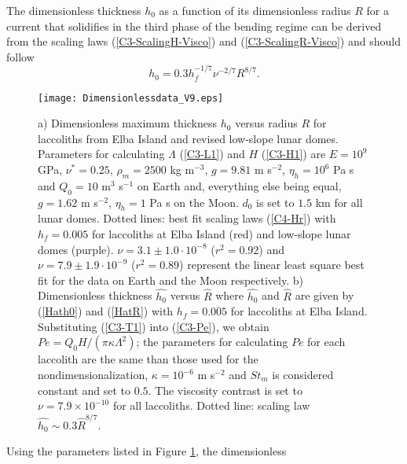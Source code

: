 The dimensionless thickness  $h_0$ as a function  of its dimensionless
radius $R$  for a current  that solidifies in  the third phase  of the
bending   regime    can   be    derived   from   the    scaling   laws
(\ref{C3-ScalingH-Visco})  and  (\ref{C3-ScalingR-Visco})  and  should
follow
\begin{equation}
  h_0 = 0.3 h_f^{-1/7}\nu^{-2/7}R^{8/7}\label{C4-Hr}.
\end{equation}
\begin{figure}[h!]
  \begin{center}
    \graphicspath{ {/Users/thorey/Documents/These/Projet/Refroidissement/Skin_Model/Figure/Figure_Heating/} }
    \texttt{[image: Dimensionlessdata\_V9.eps]}
    \caption{a)  Dimensionless maximum  thickness $h_0$  versus radius
      $R$ for laccoliths from Elba  Island and revised low-slope lunar
      domes.  Parameters  for calculating $\Lambda$  (\ref{C3-L1}) and
      $H$    (\ref{C3-H1})    are    $E=10^9$    GPa,    $\nu^*=0.25$,
      $\rho_m = 2500$ kg m$^{-3}$, $g=9.81$ m s$^{-2}$, $\eta_h =10^6$
      Pa s and $Q_0 = 10$ m$^3$ s$^{-1}$ on Earth and, everything else
      being  equal, $g=1.62$  m  s$^{-2}$,  $\eta_h =1$  Pa  s on  the
      Moon. $d_0$  is set  to $1.5$  km for  all lunar  domes.  Dotted
      lines: best  fit scaling laws  (\ref{C4-Hr}) with $h_f  = 0.005$
      for laccoliths  at Elba Island  (red) and low-slope  lunar domes
      (purple).   $\nu =  3.1\pm 1.0  \cdot 10^{-8}$  ($r^2=0.92$) and
      $\nu  = 7.9\pm  1.9  \cdot 10^{-9}$  ($r^2=0.89$) represent  the
      linear least square best fit for  the data on Earth and the Moon
      respectively.   b)  Dimensionless thickness  $\hat{h_0}$  versus
      $\hat{R}$  where   $\hat{h_0}$  and   $\hat{R}$  are   given  by
      (\ref{Hath0}) and  (\ref{HatR}) with $h_f=0.005$  for laccoliths
      at Elba Island.   Substituting (\ref{C3-T1}) into (\ref{C3-Pe}),
      we obtain $Pe  = Q_0 H /(\pi \kappa  \Lambda^2)$; the parameters
      for calculating $Pe$ for each  laccolith are the same than those
      used for the  nondimensionalization, $\kappa=10^{-6}$ m s$^{-2}$
      and  $St_m$  is  considered  constant and  set  to  $0.5$.   The
      viscosity contrast is  set to $\nu =7.9\times  10^{-10}$ for all
      laccoliths.         Dotted        line:       scaling        law
      $ \hat{h_0} \sim 0.3\hat{R}^{8/7}$.}
    \label{C4-Data}
  \end{center}
\end{figure}
Using the parameters listed in Figure \ref{C4-Data}, the dimensionless
